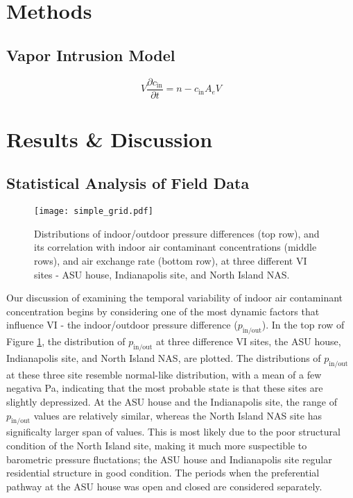 \documentclass[journal=esthag,manuscript=article]{achemso}
\begin{document}
\section{Methods}

\subsection{Vapor Intrusion Model}

\begin{equation}
  V \frac{\partial c_\mathrm{in}}{\partial t} = n - c_\mathrm{in} A_e V \label{eq:indoor_air}
\end{equation}

\section{Results \& Discussion}

\subsection{Statistical Analysis of Field Data}

\begin{figure}[!h]
		\centering
    \caption{Distributions of indoor/outdoor pressure differences (top row), and its correlation with indoor air contaminant concentrations (middle rows), and air exchange rate (bottom row), at three different VI sites - ASU house, Indianapolis site, and North Island NAS.}
    \label{fig:pair_grid}
    \texttt{[image: simple\_grid.pdf]}
\end{figure}

Our discussion of examining the temporal variability of indoor air contaminant concentration begins by considering one of the most dynamic factors that influence VI - the indoor/outdoor pressure difference ($p_\mathrm{in/out}$).
In the top row of Figure \ref{fig:pair_grid}, the distribution of $p_\mathrm{in/out}$ at three difference VI sites, the ASU house, Indianapolis site, and North Island NAS, are plotted.
The distributions of $p_\mathrm{in/out}$ at these three site resemble normal-like distribution, with a mean of a few negativa Pa, indicating that the most probable state is that these sites are slightly depressized.
At the ASU house and the Indianapolis site, the range of $p_\mathrm{in/out}$ values are relatively similar, whereas the North Island NAS site has significalty larger span of values.
This is most likely due to the poor structural condition of the North Island site, making it much more suspectible to barometric pressure fluctations; the ASU house and Indianapolis site regular residential structure in good condition.
The periods when the preferential pathway at the ASU house was open and closed are considered separately.
\end{document}

